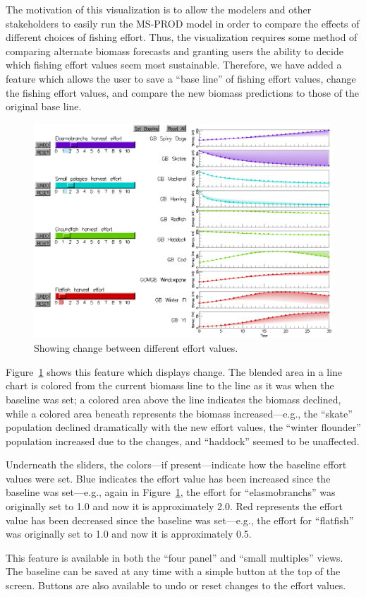 The motivation of this visualization is to allow the modelers and other stakeholders to easily run the MS-PROD model in order to compare the effects of different choices of fishing effort.  Thus, the visualization requires some method of comparing alternate biomass forecasts and granting users the ability to decide which fishing effort values seem most sustainable.  Therefore, we have added a feature which allows the user to save a ``base line'' of fishing effort values, change the fishing effort values, and compare the new biomass predictions to those of the original base line.

\begin{figure}[h]
	\centering
	\includegraphics[width=12cm]{figures/eps/msprod_change.eps}
	\caption{Showing change between different effort values.}
	\label{fig:msprod_change}
\end{figure}

Figure~\ref{fig:msprod_change} shows this feature which displays change.  The blended area in a line chart is colored from the current biomass line to the line as it was when the baseline was set; a colored area above the line indicates the biomass declined, while a colored area beneath represents the biomass increased---e.g., the ``skate'' population declined dramatically with the new effort values, the ``winter flounder'' population increased due to the changes, and ``haddock'' seemed to be unaffected.

Underneath the sliders, the colors---if present---indicate how the baseline effort values were set.  Blue indicates the effort value has been increased since the baseline was set---e.g., again in Figure~\ref{fig:msprod_change}, the effort for ``elasmobranchs'' was originally set to 1.0 and now it is approximately 2.0.  Red represents the effort value has been decreased since the baseline was set---e.g., the effort for ``flatfish'' was originally set to 1.0 and now it is approximately 0.5.

This feature is available in both the ``four panel'' and ``small multiples'' views.  The baseline can be saved at any time with a simple button at the top of the screen.  Buttons are also available to undo or reset changes to the effort values.
